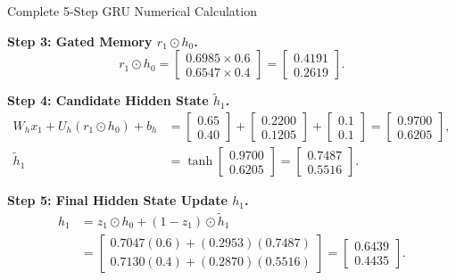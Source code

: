 \documentclass[a4paper,11pt]{article}
\begin{document}
\begin{worked}{Complete 5-Step GRU Numerical Calculation}
\begin{steps}
  \item \textbf{Step 3: Gated Memory $r_1 \odot h_0$.}
        $$r_1 \odot h_0 = \begin{bmatrix} 0.6985 \times 0.6 \\ 0.6547 \times 0.4 \end{bmatrix} = \begin{bmatrix} 0.4191 \\ 0.2619 \end{bmatrix}.$$
  \item \textbf{Step 4: Candidate Hidden State $\tilde{h}_1$.}
        \begin{align*}
          W_h x_1 + U_h (r_1 \odot h_0) + b_h &= \begin{bmatrix} 0.65 \\ 0.40 \end{bmatrix} + \begin{bmatrix} 0.2200 \\ 0.1205 \end{bmatrix} + \begin{bmatrix} 0.1 \\ 0.1 \end{bmatrix} = \begin{bmatrix} 0.9700 \\ 0.6205 \end{bmatrix}, \\
          \tilde{h}_1 &= \tanh\begin{bmatrix} 0.9700 \\ 0.6205 \end{bmatrix} = \begin{bmatrix} 0.7487 \\ 0.5516 \end{bmatrix}.
        \end{align*}
  \item \textbf{Step 5: Final Hidden State Update $h_1$.}
        \begin{align*}
          h_1 &= z_1 \odot h_0 + (1 - z_1) \odot \tilde{h}_1 \\
              &= \begin{bmatrix} 0.7047(0.6) + (0.2953)(0.7487) \\ 0.7130(0.4) + (0.2870)(0.5516) \end{bmatrix} = \begin{bmatrix} 0.6439 \\ 0.4435 \end{bmatrix}.
        \end{align*}
\end{steps}
\end{worked}
\end{document}
